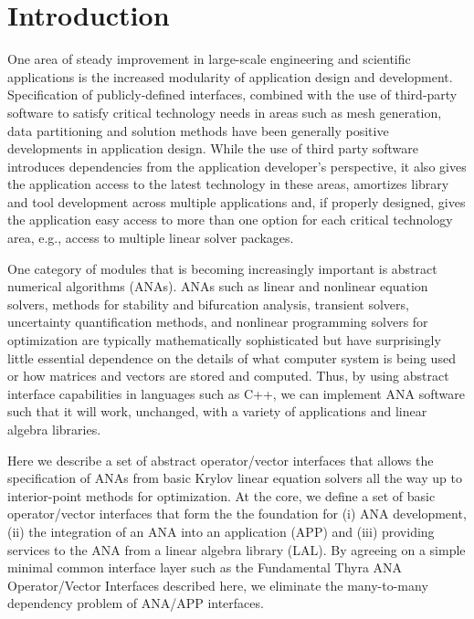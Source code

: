 \documentclass[pdf,ps2pdf,11pt]{SANDreport}
\begin{document}
%
\SANDmain %

\section{Introduction}

One area of steady improvement in large-scale engineering and
scientific applications is the increased modularity of application
design and development.  Specification of publicly-defined interfaces,
combined with the use of third-party software to satisfy critical
technology needs in areas such as mesh generation, data partitioning
and solution methods have been generally positive developments in
application design.  While the use of third party software introduces
dependencies from the application developer's perspective, it also
gives the application access to the latest technology in these areas,
amortizes library and tool development across multiple applications
and, if properly designed, gives the application easy access to more
than one option for each critical technology area, e.g., access to
multiple linear solver packages.

One category of modules that is becoming increasingly important is abstract
numerical algorithms (ANAs).  ANAs such as linear and nonlinear equation
solvers, methods for stability and bifurcation analysis, transient solvers,
uncertainty quantification methods, and nonlinear programming solvers for
optimization are typically mathematically sophisticated but have surprisingly
little essential dependence on the details of what computer system is being
used or how matrices and vectors are stored and computed.  Thus, by using
abstract interface capabilities in languages such as C++, we can implement ANA
software such that it will work, unchanged, with a variety of applications and
linear algebra libraries.


Here we describe a set of abstract operator/vector interfaces that allows the
specification of ANAs from basic Krylov linear equation solvers all the way up
to interior-point methods for optimization.  At the core, we define a set of
basic operator/vector interfaces that form the the foundation for (i) ANA
development, (ii) the integration of an ANA into an application (APP) and
(iii) providing services to the ANA from a linear algebra library (LAL).  By
agreeing on a simple minimal common interface layer such as the Fundamental
Thyra ANA Operator/Vector Interfaces described here, we eliminate the
many-to-many dependency problem of ANA/APP interfaces.
\end{document}
